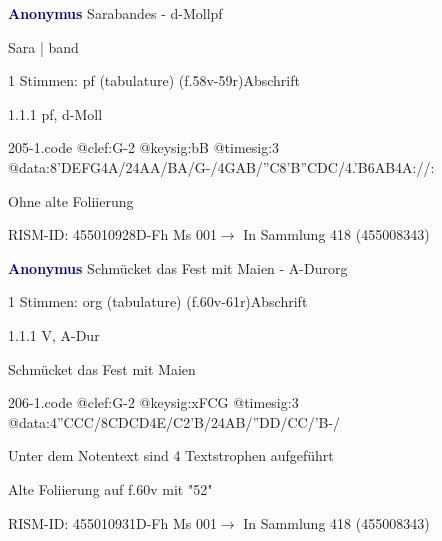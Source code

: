\documentclass[twocolumn]{book}
\begin{document}
\par \vspace{7pt} \textcolor{darkblue}{\textbf{Anonymus  }}\hfillplus{\textbf{[205]}}\newline Sarabandes - d-Moll\newline pf
\par \begin{itshape}[f.58v, at left:] Sara | band\end{itshape} 
\par \textcolor{darkblue}{}  1 Stimmen: pf (tabulature)  (f.58v-59r)\newline Abschrift
\par 1.1.1  pf, d-Moll  
\begin{filecontents*}{205-1.code}
@clef:G-2
@keysig:bB
@timesig:3
@data:{8'DEFG}4A/24AA/BA/G-/4GAB/''C{8'B''CDC}/4.'B{6AB}4A://:
\end{filecontents*}
\newline
%
\par Ohne alte Foliierung
\par RISM-ID: 455010928\newline D-Fh  Ms 001\newline $\rightarrow$ In Sammlung 418 (455008343)
      
\par \vspace{7pt} \textcolor{darkblue}{\textbf{Anonymus  }}\hfillplus{\textbf{[206]}}\newline Schmücket das Fest mit Maien - A-Dur\newline org
\par \begin{itshape}\end{itshape} 
\par \textcolor{darkblue}{}  1 Stimmen: org (tabulature)  (f.60v-61r)\newline Abschrift
\par 1.1.1  V, A-Dur\newline \begin{footnotesize} Schmücket das Fest mit Maien \end{footnotesize}  
\begin{filecontents*}{206-1.code}
@clef:G-2
@keysig:xFCG
@timesig:3
@data:4''CCC/{8CDCD}4E/C2'B/24AB/''DD/CC/'B-/
\end{filecontents*}
\newline
%
\par Unter dem Notentext sind 4 Textstrophen aufgeführt
\par Alte Foliierung auf f.60v mit "52"
\par RISM-ID: 455010931\newline D-Fh  Ms 001\newline $\rightarrow$ In Sammlung 418 (455008343)
      
\end{document}
